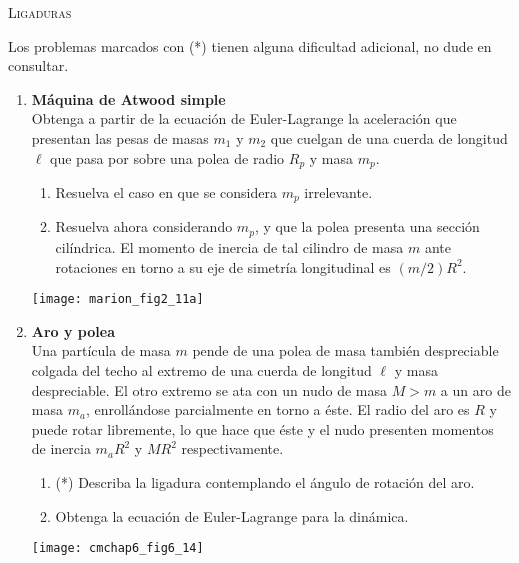 \documentclass[11pt, spanish, a4paper, twoside]{article}
\begin{document}
\begin{center}
  \textsc{\large Ligaduras}
\end{center}

\noindent
Los problemas marcados con (*) tienen alguna dificultad adicional, no dude en consultar.
\begin{enumerate}


\item 
\begin{minipage}[t][4.5cm]{0.68\textwidth}
	\textbf{Máquina de Atwood simple}\\
	Obtenga a partir de la ecuación de Euler-Lagrange la aceleración que presentan las pesas de masas \(m_1\) y \(m_2\) que cuelgan de una cuerda de longitud \(\ell\) que pasa por sobre una polea de radio \(R_p\) y masa \(m_p\).
	\begin{enumerate}
		\item Resuelva el caso en que se considera \(m_p\) irrelevante.
		\item Resuelva ahora considerando \(m_p\), y que la polea presenta una sección cilíndrica.
			El momento de inercia de tal cilindro de masa \(m\) ante rotaciones en torno a su eje de simetría longitudinal es \((m/2) R^2\).
	\end{enumerate}
\end{minipage}
\begin{minipage}[c][0cm][t]{0.3\textwidth}
	\texttt{[image: marion\_fig2\_11a]}
\end{minipage}


\item 
\begin{minipage}[t][4.5cm]{0.75\textwidth}
\textbf{Aro y polea}\\
	Una partícula de masa \(m\) pende de una polea de masa también despreciable colgada del techo al extremo de una cuerda de longitud \(\ell\) y masa despreciable.
	El otro extremo se ata con un nudo de masa \(M> m\) a un aro de masa \(m_a\), enrollándose parcialmente en torno a éste.
	El radio del aro es \(R\) y puede rotar libremente, lo que hace que éste y el nudo presenten momentos de inercia \(m_a R^2\) y \(M R^2\) respectivamente.
	\begin{enumerate}
		\item (*) Describa la ligadura contemplando el ángulo de rotación del aro.
		\item Obtenga la ecuación de Euler-Lagrange para la dinámica.
\end{enumerate}
\end{minipage}
\begin{minipage}[c][0cm][t]{0.2\textwidth}
	\texttt{[image: cmchap6\_fig6\_14]}
\end{minipage}



\end{enumerate}
\end{document}
